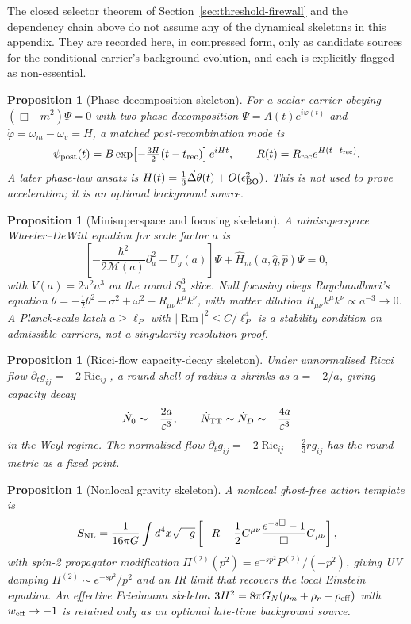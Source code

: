 \documentclass[11pt,a4paper]{article}
\newtheorem{proposition}[theorem]{Proposition}
\newcommand{\Ric}{\operatorname{Ric}}
\newcommand{\Rm}{\operatorname{Rm}}
\newcommand{\Boxop}{\Box}
\begin{document}
The closed selector theorem of Section~\ref{sec:threshold-firewall} and the dependency chain above do not assume any of the dynamical skeletons in this appendix.  They are recorded here, in compressed form, only as candidate sources for the conditional carrier's background evolution, and each is explicitly flagged as non-essential.

\begin{proposition}[Phase-decomposition skeleton]
For a scalar carrier obeying $(\Boxop+m^2)\Psi=0$ with two-phase decomposition $\Psi=A(t)e^{i\varphi(t)}$ and $\dot\varphi=\omega_m-\omega_v=H$, a matched post-recombination mode is
\[
\psi_{\rm post}(t)=B\exp\!\left[-\tfrac{3H}{2}(t-t_{\rm rec})\right]e^{iHt},
\qquad
R(t)=R_{\rm rec}e^{H(t-t_{\rm rec})}.
\]
A later phase-law ansatz is $H(t)=\tfrac13\dot{\Delta\theta}(t)+O(\epsilon_{\rm BO}^2)$.  This is not used to prove acceleration; it is an optional background source.
\end{proposition}

\begin{proposition}[Minisuperspace and focusing skeleton]
A minisuperspace Wheeler--DeWitt equation for scale factor $a$ is
\[
\left[-\frac{\hbar^2}{2\mathcal M(a)}\partial_a^2+U_g(a)\right]\Psi+\hat H_m(a,\hat q,\hat p)\Psi=0,
\]
with $V(a)=2\pi^2a^3$ on the round $S^3_a$ slice.  Null focusing obeys Raychaudhuri's equation
$\dot\theta=-\tfrac12\theta^2-\sigma^2+\omega^2-R_{\mu\nu}k^\mu k^\nu$, with matter dilution $R_{\mu\nu}k^\mu k^\nu\propto a^{-3}\to0$.  A Planck-scale latch $a\ge\ell_P$ with $|\Rm|^2\le C/\ell_P^4$ is a stability condition on admissible carriers, not a singularity-resolution proof.
\end{proposition}

\begin{proposition}[Ricci-flow capacity-decay skeleton]
Under unnormalised Ricci flow $\partial_tg_{ij}=-2\Ric_{ij}$, a round shell of radius $a$ shrinks as $\dot a=-2/a$, giving capacity decay
\[
\dot N_0\sim-\frac{2a}{\varepsilon^3},
\qquad
\dot N_{\rm TT}\sim\dot N_D\sim-\frac{4a}{\varepsilon^3}
\]
in the Weyl regime.  The normalised flow $\partial_tg_{ij}=-2\Ric_{ij}+\tfrac23 r g_{ij}$ has the round metric as a fixed point.
\end{proposition}

\begin{proposition}[Nonlocal gravity skeleton]
A nonlocal ghost-free action template is
\[
S_{\rm NL}=\frac{1}{16\pi G}\int d^4x\sqrt{-g}\left[-R-\frac12G^{\mu\nu}\frac{e^{-s\Boxop}-1}{\Boxop}G_{\mu\nu}\right],
\]
with spin-2 propagator modification $\Pi^{(2)}(p^2)=e^{-sp^2}P^{(2)}/(-p^2)$, giving UV damping $\Pi^{(2)}\sim e^{-sp^2}/p^2$ and an IR limit that recovers the local Einstein equation.  An effective Friedmann skeleton $3H^2=8\pi G_N(\rho_m+\rho_r+\rho_{\rm eff})$ with $w_{\rm eff}\to-1$ is retained only as an optional late-time background source.
\end{proposition}
\end{document}
